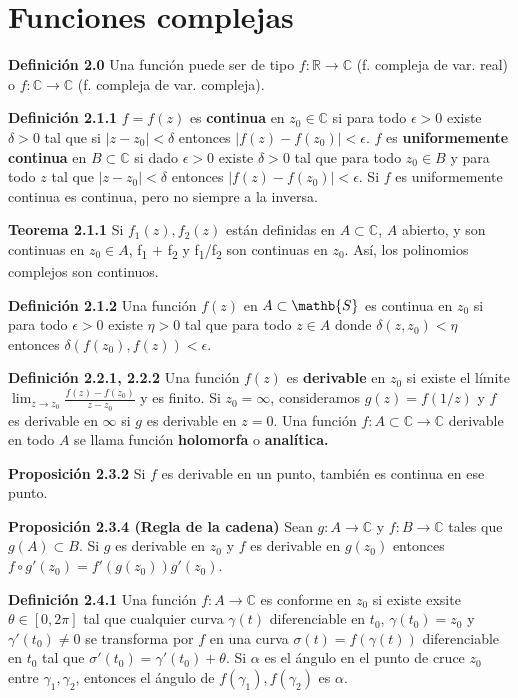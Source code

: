 \documentclass[a4paper, 11pt]{extarticle}
\newcommand{\tma}[1]{\textcolor{rojo}{\textbf{Teorema #1}}}
\newcommand{\propo}[1]{\textcolor{rojo}{\textbf{Proposición #1}}}
\newcommand{\defi}[1]{\textcolor{azul}{\textbf{Definición #1}}}
\begin{document}
\section*{Funciones complejas}
\label{sec:org45463ca}
\begin{multicols*}{2}
\defi{2.0} Una función puede ser de tipo \(f: \mathbb{R} \rightarrow
\mathbb{C}\) (f. compleja de var. real) o 
\(f: \mathbb{C} \rightarrow  \mathbb{C}\) (f. compleja de var. compleja).

\defi{2.1.1} \(f = f(z)\) es \textbf{continua} en \(z_0 \in \mathbb{C}\) si para todo \(\epsilon > 0\) existe \(\delta > 0\) tal que si \(|z - z_0| < \delta\)
entonces \(|f(z) - f(z_0)| < \epsilon\). \(f\) es \textbf{uniformemente continua} en
\(B \subset \mathbb{C}\) si
dado \(\epsilon > 0\) existe \(\delta > 0\) tal que para todo \(z_0 \in B\) y para todo \(z\) tal que \(|z-z_0| < \delta\) entonces \(|f(z) -
f(z_0)| < \epsilon\).  Si \(f\) es uniformemente continua es continua, pero
no siempre a la inversa.

\tma{2.1.1} Si \(f_1(z), f_2(z)\) están definidas en \(A \subset \mathbb{C}\), \(A\) abierto, y son continuas en \(z_0 \in A\), f\textsubscript{1} + f\textsubscript{2} y f\textsubscript{1}/f\textsubscript{2} son
continuas en \(z_0\). Así, los polinomios complejos son continuos.

\defi{2.1.2} Una función \(f(z)\) en \(A \subset \mathb{S}\) es continua en
\(z_0\) si para todo \(\epsilon > 0\)
 existe \(\eta > 0\) tal que para todo \(z \in A\) donde \(\delta(z, z_0) <
\eta\) entonces \(\delta(f(z_0), f(z)) < \epsilon\).

\defi{2.2.1, 2.2.2} Una función \(f(z)\) es \textbf{derivable} en \(z_0\) si existe el
límite \(\lim_{z \to z_0} \frac{f(z) - f(z_0)}{z-z_0}\) y es finito.
Si \(z_0 = \infty\), consideramos \(g(z) = f(1/z)\) y \(f\) es derivable
en \(\infty\) si \(g\) es derivable en \(z=0\).
Una función \(f:A \subset \mathbb{C} \rightarrow  \mathbb{C}\) derivable en todo
\(A\) se llama función \textbf{holomorfa} o \textbf{analítica.}

\propo{2.3.2} Si \(f\) es derivable en un punto, también es continua en ese
punto.

\propo{2.3.4 (Regla de la cadena)} Sean \(g:A \rightarrow  \mathbb{C}\) y \(f: B \rightarrow \mathbb{C}\) tales que \(g(A) \subset B\). Si \(g\) es
derivable en \(z_0\) y \(f\) es derivable en \(g(z_0)\) entonces \(f
\circ g'(z_0) = f'(g(z_0))g'(z_0)\).

\defi{2.4.1} Una función \(f: A \rightarrow  \mathbb{C}\) es conforme en \(z_0\) si existe exsite \(\theta \in [0, 2\pi]\) tal que cualquier curva \(\gamma(t)\) diferenciable en \(t_0\), \(\gamma(t_0) = z_0\) y \(\gamma'(t_0) \neq 0\) se transforma por \(f\) en una curva \(\sigma(t) =
f(\gamma(t))\) diferenciable en \(t_0\) tal que \(\sigma'(t_0) =
\gamma'(t_0) + \theta\). Si \(\alpha\) es el ángulo en el punto de cruce \(z_0\) entre \(\gamma_1, \gamma_2\), entonces el ángulo de \(f(\gamma_1),
f(\gamma_2)\) es \(\alpha\).  


\end{multicols*}
\end{document}
